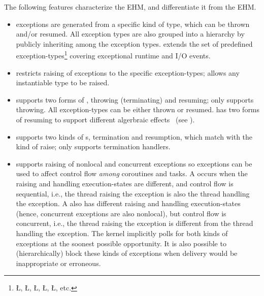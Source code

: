 \documentclass[openright,twoside]{report}
\begin{document}
The following features characterize the \uC EHM, and differentiate it from the \CC EHM.
\begin{itemize}
\item
\uC exceptions are generated from a specific kind of type, which can be thrown and/or resumed.
All exception types are also grouped into a hierarchy by publicly inheriting among the exception types.
\uC extends the \CC set of predefined exception-types\footnote{\LGinlinetrue\LGbegin\lgrinde\L{}\endlgrinde\LGend{}, \LGinlinetrue\LGbegin\lgrinde\L{}\endlgrinde\LGend{}, \LGinlinetrue\LGbegin\lgrinde\L{}\endlgrinde\LGend{}, \LGinlinetrue\LGbegin\lgrinde\L{}\endlgrinde\LGend{}, \LGinlinetrue\LGbegin\lgrinde\L{}\endlgrinde\LGend{}, etc.} covering \uC exceptional runtime and I/O events.
\item
\uC restricts raising of exceptions to the specific exception-types;
\CC allows any instantiable type to be raised.
\item
\uC supports two forms of , throwing (terminating) and resuming;
\CC only supports throwing.
All \uC exception-types can be either thrown or resumed.
\uC has two forms of resuming to support different algerbraic effects~\cite{Bauer15} (see ).
\item
\uC supports two kinds of s, termination and resumption, which match with the kind of raise;
\CC only supports termination handlers.
\item
\uC supports raising of nonlocal and concurrent exceptions so exceptions can be used to affect control flow \emph{among} coroutines and tasks.
A  occurs when the raising and handling execution-states are different, and control flow is sequential, i.e., the thread raising the exception is also the thread handling the exception.
A  also has different raising and handling execution-states (hence, concurrent exceptions are also nonlocal), but control flow is concurrent, i.e., the thread raising the exception is different from the thread handling the exception.
The \uC kernel implicitly polls for both kinds of exceptions at the soonest possible opportunity.
It is also possible to (hierarchically) block these kinds of exceptions when delivery would be inappropriate or erroneous.
\end{itemize}
\end{document}
